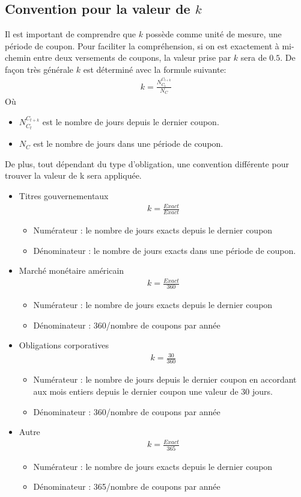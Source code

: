 \documentclass[letterpaper, 12pt]{article}
\newcommand{\1}{\mathds{1}}	%
\theoremstyle{definition}
\begin{document}
\subsection{Convention pour la valeur de $k$}
Il est important de comprendre que $k$ possède comme unité de mesure, une période de coupon. Pour faciliter la compréhension, si on est exactement à mi-chemin entre deux versements de coupons, la valeur prise par $k$ sera de $0.5$. De façon très générale $k$ est déterminé avec la formule suivante:
\begin{align*}
k= \frac{N_{C_{t}}^{C_{t+k}}}{N_C}
\end{align*}
Où 
\begin{itemize}
\item $N_{C_{t}}^{C_{t+k}}$ est le nombre de jours depuis le dernier coupon. 
\item $N_C$ est le nombre de jours dans une période de coupon. 
\end{itemize}
\newpage
De plus, tout dépendant du type d'obligation, une convention différente pour trouver la valeur de k sera appliquée.
\begin{itemize}
\item Titres gouvernementaux
\begin{align*}
k=\frac{Exact}{Exact}
\end{align*}
\begin{itemize}
\item Numérateur : le nombre de jours exacts depuis le dernier coupon
\item Dénominateur : le nombre de jours exacts dans une période de coupon.
\end{itemize}
\item Marché monétaire américain 
\begin{align*}
k=\frac{Exact}{360}
\end{align*}
\begin{itemize}
\item Numérateur : le nombre de jours exacts depuis le dernier coupon
\item Dénominateur : 360/nombre de coupons par année
\end{itemize}
\item Obligations corporatives 
\begin{align*}
k=\frac{30}{360}
\end{align*}
\begin{itemize}
\item Numérateur : le nombre de jours depuis le dernier coupon en accordant aux mois entiers depuis le dernier coupon une valeur de 30 jours.
\item Dénominateur : 360/nombre de coupons par année
\end{itemize}
\item Autre 
\begin{align*}
k=\frac{Exact}{365}
\end{align*}
\begin{itemize}
\item Numérateur : le nombre de jours exacts depuis le dernier coupon
\item Dénominateur : 365/nombre de coupons par année
\end{itemize}
\end{itemize}
\end{document}
